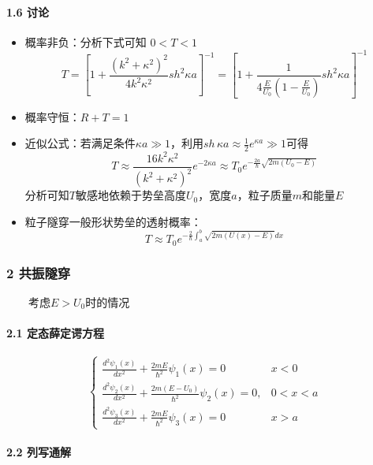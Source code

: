 \documentclass[UTF8,twocolumn]{ctexart}
\providecommand{\tightlist}{%
  \setlength{\itemsep}{0pt}\setlength{\parskip}{0pt}}
\let\oldparagraph\paragraph
\renewcommand{\paragraph}[1]{\oldparagraph{#1}\mbox{}}
\begin{document}
\hypertarget{ux8ba8ux8bba-4}{%
\paragraph{{ }1.6 讨论}\label{ux8ba8ux8bba-4}}

\begin{itemize}
\tightlist
\item
  概率非负：分析下式可知 \(0<T<1\) \[
  T=[1+\frac{(k^2+\kappa^2)^2}{4k^2\kappa^2}sh^2\kappa a]^{-1}
  =[1+\frac{1}{4\frac{E}{U_0}(1-\frac{E}{U_0})}sh^2\kappa a]^{-1}\]
\item
  概率守恒：\(R+T=1\)
\item
  近似公式：若满足条件\(\kappa a\gg1\)，利用\(sh\,\kappa a\approx\frac{1}{2}e^{\kappa a}\gg1\)可得
  \[
  T\approx\frac{16k^2\kappa^2}{(k^2+\kappa^2)^2}e^{-2\kappa a}\approx T_0e^{-\frac{2a}{\hbar}\sqrt{2m(U_0-E)}}
  \]
  分析可知\(T\)敏感地依赖于势垒高度\(U_0\)，宽度\(a\)，粒子质量\(m\)和能量\(E\)
\item
  粒子隧穿一般形状势垒的透射概率：
  \[T\approx T_0e^{-\frac{2}{\hbar}\int_a^b\sqrt{2m(U(x)-E)}dx}\]
\end{itemize}

\hypertarget{ux5171ux632fux96a7ux7a7f}{%
\subsubsection{2 共振隧穿}\label{ux5171ux632fux96a7ux7a7f}}

  考虑\(E>U_0\)时的情况

\hypertarget{ux5b9aux6001ux859bux5b9aux8c14ux65b9ux7a0b-5}{%
\paragraph{{ }2.1
定态薛定谔方程}\label{ux5b9aux6001ux859bux5b9aux8c14ux65b9ux7a0b-5}}

\[\begin{cases} 
        \frac{d^2\psi_1(x)}{dx^2}+\frac{2mE}{\hbar^2}\psi_1(x)=0 & x<0\\
        \frac{d^2\psi_2(x)}{dx^2}+\frac{2m(E-U_0)}{\hbar^2}\psi_2(x)=0, & 0<x<a\\
        \frac{d^2\psi_3(x)}{dx^2}+\frac{2mE}{\hbar^2}\psi_3(x)=0 & x>a
\end{cases}\]

\hypertarget{ux5217ux5199ux901aux89e3-3}{%
\paragraph{{ }2.2 列写通解}\label{ux5217ux5199ux901aux89e3-3}}
\end{document}
